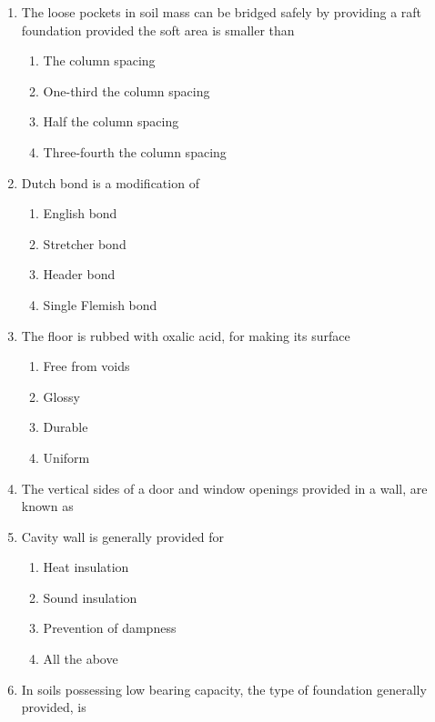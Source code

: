 \documentclass[11pt,a4paper]{article}
\begin{document}
\begin{enumerate}
\begin{enumerate}[label=\Alph*.]
\end{enumerate}
\item{The loose pockets in soil mass can be bridged safely by providing a raft foundation provided the soft area is smaller than}
\begin{enumerate}[label=\Alph*.]
\item{The column spacing}
\item{One-third the column spacing}
\item{Half the column spacing}
\item{Three-fourth the column spacing}
\end{enumerate}
\item{Dutch bond is a modification of}
\begin{enumerate}[label=\Alph*.]
\item{English bond}
\item{Stretcher bond}
\item{Header bond}
\item{Single Flemish bond}
\end{enumerate}
\item{The floor is rubbed with oxalic acid, for making its surface}
\begin{enumerate}[label=\Alph*.]
\item{Free from voids}
\item{Glossy}
\item{Durable}
\item{Uniform}
\end{enumerate}
\item{The vertical sides of a door and window openings provided in a wall, are known as}
\\
\item{Cavity wall is generally provided for}
\begin{enumerate}[label=\Alph*.]
\item{Heat insulation}
\item{Sound insulation}
\item{Prevention of dampness}
\item{All the above}
\end{enumerate}
\item{In soils possessing low bearing capacity, the type of foundation generally provided, is}

\end{enumerate}
\end{document}
